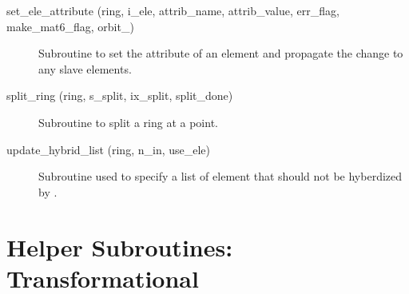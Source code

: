 \begin{description}
\item[set\_ele\_attribute (ring, i\_ele, attrib\_name, attrib\_value, 
err\_flag, make\_mat6\_flag, orbit\_)] \Newline
Subroutine to set the attribute of an element and propagate the change to any slave elements. 

\item[split\_ring (ring, s\_split, ix\_split, split\_done)] \Newline
Subroutine to split a ring at a point.

\item[update\_hybrid\_list (ring, n\_in, use\_ele)] \Newline
Subroutine used to specify a list of element that should not be
hyberdized by .

\end{description}

\section{Helper Subroutines: Transformational}
\label{r:trans}    

